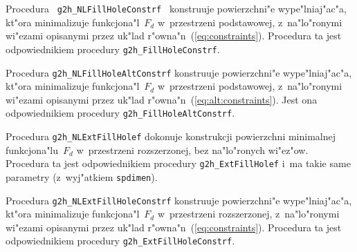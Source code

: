 \vspace{\bigskipamount}
\begin{sloppypar}
Procedura \texttt{ g2h\_NLFillHoleConstrf } konstruuje powierzchni"e
wype"lniaj"ac"a, kt"o\-ra minimalizuje funkcjona"l~$F_d$ w~przestrzeni
podstawowej, z~na"lo"ronymi wi"ezami opisanymi przez uk"lad
r"owna"n~(\ref{eq:constraints}). Procedura ta jest odpowiednikiem
procedury \texttt{g2h\_FillHoleConstrf}.%
\end{sloppypar}

\vspace{\bigskipamount}
Procedura \texttt{g2h\_NLFillHoleAltConstrf} konstruuje powierzchni"e
wype"lniaj"ac"a, kt"ora minimalizuje funkcjona"l~$F_d$ w~przestrzeni
podstawowej, z~na"lo"ronymi wi"ezami opisanymi przez uk"lad
r"owna"n~(\ref{eq:alt:constraints}). Jest ona odpowiednikiem
procedury \texttt{g2h\_FillHoleAltConstrf}.

\vspace{\bigskipamount}
Procedura \texttt{g2h\_NLExtFillHolef} dokonuje konstrukcji powierzchni
minimalnej funkcjona"lu~$F_d$ w~przestrzeni rozszerzonej, bez na"lo"ronych
wi"ez"ow. Procedura ta jest odpowiednikiem procedury \texttt{g2h\_ExtFillHolef}
i~ma takie same parametry (z~wyj"atkiem \texttt{spdimen}).

\vspace{\bigskipamount}
Procedura \texttt{g2h\_NLExtFillHoleConstrf} konstruuje powierzchni"e
wype"lniaj"ac"a, kt"ora minimalizuje funkcjona"l~$F_d$ w~przestrzeni
rozszerzonej, z~na"lo"ronymi wi"ezami opisanymi przez uk"lad
r"owna"n~(\ref{eq:constraints}). Procedura ta jest odpowiednikiem
procedury \texttt{g2h\_ExtFillHoleConstrf}.

